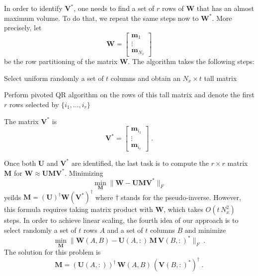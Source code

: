 In order to identify $\mathbf{V^*}$, one needs to find a set of $r$ rows of $\mathbf{W}$
that has an almost maximum volume. To do that, we repeat the same
steps now to $\mathbf{W^*}$. More precisely, let
\begin{equation}
\mathbf{W} = 
\begin{bmatrix}
  \mathbf{m}_1 \\
  \vdots\\
  \mathbf{m}_{N_x}
\end{bmatrix}
\label{eq:w}
\end{equation}
be the row partitioning of the matrix $\mathbf{W}$. The algorithm takes the
following steps:
\begin{algorithmic}[1]
  \STATE Select uniform randomly a set of $t$ columns and obtain an
  $N_x \times t$ tall matrix

  \STATE Perform pivoted QR algorithm on the rows of this tall matrix
  and denote the first $r$ rows selected by $\{i_1,\ldots,i_r\}$
  
  \STATE The matrix $\mathbf{V^*}$ is
  \begin{equation}
  \mathbf{V^*} = 
  \begin{bmatrix}
    \mathbf{m}_{i_1} \\
    \vdots\\
    \mathbf{m}_{i_r}
  \end{bmatrix}\;.
  \label{eq:v}
  \end{equation}
\end{algorithmic}

Once both $\mathbf{U}$ and $\mathbf{V^*}$ are identified, the last task is to compute
the $r\times r$ matrix $\mathbf{M}$ for $ \mathbf{W} \approx \mathbf{U M V^*}$. Minimizing
\begin{equation}
\min_{\mathbf{M}} \lVert \mathbf{W - U M V^*} \rVert_F
\label{eq:min}
\end{equation} 
yeilds $ \mathbf{M = (U)^{\dagger} W (V^*)}^{\dagger}$ where $\dagger$ stands for the
pseudo-inverse. However, this formula requires taking matrix product
with $\mathbf{W}$, which takes $O(t\,N_x^2)$ steps. In order to achieve linear
scaling, the fourth idea of our approach is to select randomly a set
of $t$ rows $A$ and a set of $t$ columns $B$ and minimize
\begin{equation}
\min_{\mathbf{M}} \lVert \mathbf{W}(A,B) - \mathbf{U}(A,:) \, \mathbf{M} \, \mathbf{V}(B,:)^* \rVert_F\;.
\label{eq:min2}
\end{equation}
The solution for this problem is 
\begin{equation}
\mathbf{M} = (\mathbf{U}(A,:))^{\dagger} \,\mathbf{W}(A,B) \, \left(\mathbf{V}(B,:)^*\right)^{\dagger}\;.
\label{eq:m}
\end{equation}

